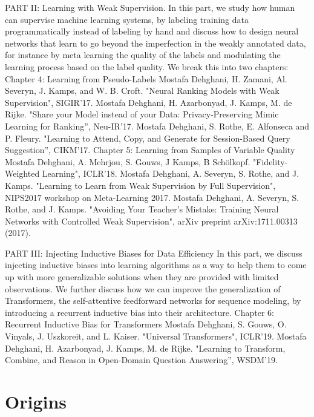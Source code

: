 PART II: Learning with Weak Supervision.
In this part, we study how human can supervise machine learning systems, by labeling training data programmatically instead of labeling by hand and discuss how to design neural networks that learn to go beyond the imperfection in the weakly annotated data, for instance by meta learning the quality of the labels and modulating the learning process based on the label quality. We break this into two chapters:
Chapter 4: Learning from Pseudo-Labels
Mostafa Dehghani, H. Zamani, Al. Severyn, J. Kamps, and W. B. Croft. "Neural Ranking Models with Weak Supervision", SIGIR'17.
Mostafa Dehghani, H. Azarbonyad, J. Kamps, M. de Rijke. "Share your Model instead of your Data: Privacy-Preserving Mimic Learning for Ranking'', Neu-IR'17.
Mostafa Dehghani, S. Rothe, E. Alfonseca and P. Fleury. "Learning to Attend, Copy, and Generate for Session-Based Query Suggestion'', CIKM'17.
Chapter 5: Learning from Samples of Variable Quality
Mostafa Dehghani, A. Mehrjou, S. Gouws, J Kamps, B Schölkopf. "Fidelity-Weighted Learning", ICLR'18.
Mostafa Dehghani, A. Severyn, S. Rothe, and J. Kamps. "Learning to Learn from Weak Supervision by Full Supervision", NIPS2017 workshop on Meta-Learning 2017.
Mostafa Dehghani, A. Severyn, S. Rothe, and J. Kamps. "Avoiding Your Teacher’s Mistake: Training Neural Networks with Controlled Weak Supervision", arXiv preprint arXiv:1711.00313 (2017). 

PART III: Injecting Inductive Biases for Data Efficiency
In this part, we discuss injecting inductive biases into learning algorithms as a way to help them to come up with more generalizable solutions when they are provided with limited observations. We further discuss how we can improve the generalization of Transformers, the self-attentive feedforward networks for sequence modeling, by introducing a recurrent inductive bias into their architecture.
Chapter 6: Recurrent Inductive Bias for Transformers
Mostafa Dehghani, S. Gouws, O. Vinyals, J. Uszkoreit, and L. Kaiser. "Universal Transformers", ICLR'19.
Mostafa Dehghani, H. Azarbonyad, J. Kamps, M. de Rijke. "Learning to Transform, Combine, and Reason in Open-Domain Question Answering'', WSDM'19.


\section{Origins}




